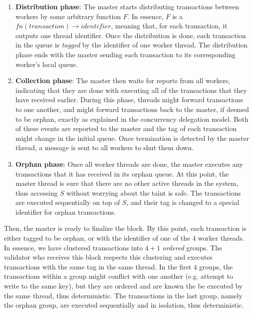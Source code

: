 \begin{enumerate}
	\item \textbf{Distribution phase}: The master starts distributing transactions between workers
	by some arbitrary function $F$. In essence, $F$ is a $fn(transaction) \rightarrow identifier$,
	meaning that, for each transaction, it outputs one thread identifier. Once the distribution is
	done, each transaction in the queue is \textit{tagged} by the identifier of one worker thread.
	The distribution phase ends with the master sending each transaction to its corresponding
	worker's local queue.

	\item \textbf{Collection phase}: The master then waits for reports from all workers, indicating
	that they are done with executing all of the transactions that they have received earlier.
	During this phase, threads might forward transactions to one another, and might forward
	transactions back to the master, if deemed to be orphan, exactly as explained in the concurrency
	delegation model. Both of these events are reported to the master and the tag of each
	transaction might change in the initial queue. Once termination is detected by the master
	thread, a message is sent to all workers to shut them down.

	\item \textbf{Orphan phase}: Once all worker threads are done, the master executes any
	transactions that it has received in its orphan queue. At this point, the master thread is sure
	that there are no other active threads in the system, thus accessing $S$ without worrying about
	the taint is safe. The transactions are executed sequentially on top of $S$, and their tag is
	changed to a special identifier for orphan transactions.
\end{enumerate}

Then, the master is ready to finalize the block. By this point, each transaction is either tagged to
be orphan, or with the identifier of one of the $4$ worker threads. In essence, we have clustered
transactions into $4 + 1$ \textit{ordered} groups. The validator who receives this block respects
this clustering and executes transactions with the same tag in the same thread. In the first $4$
groups, the transactions within a group might conflict with one another (e.g. attempt to write to
the same key), but they are ordered and are known the be executed by the same thread, thus
deterministic. The transactions in the last group, namely the orphan group, are executed
sequentially and in isolation, thus deterministic.

